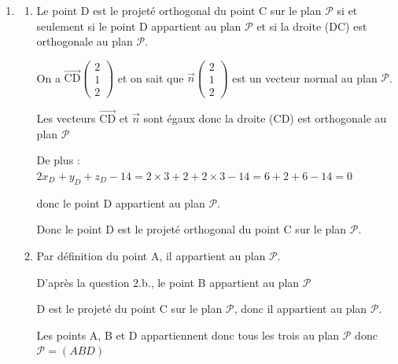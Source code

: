 \documentclass[10pt]{article}
\providecommand{\vect}[1]{\overrightarrow{#1}}
\providecommand{\vectt}[1]{\overrightarrow{\mathrm{#1}}}
\begin{document}
\begin{enumerate}
\begin{enumerate}
			Une équation cartésienne de $\mathcal{P}$ est donc bien :   $2x + y + 2z - 14 = 0$.
			\item  Un point appartient à un plan si et seulement si ses coordonnées vérifient une équation de ce plan.

			$2x_B+y_B+z_B-14 = 2 \times 5 -2 +2 \times 3 -14 =10-2+6-14 =0 $ 

			donc le point B appartient au plan $\mathcal{P}$.
			
			$2x_C+y_C+z_C-14 = 2 \times 1 +1 +2 \times 1 -14 = 2+1+2-14=-9 \neq 0 $ 
			
			donc le point C n'appartient pas au plan $\mathcal{P}$. 
			
		\end{enumerate}
		\item 
		\begin{enumerate}
			\item    Le point D est le projeté orthogonal du point C sur le plan $\mathcal{P}$ si et seulement si le point D appartient au plan $\mathcal{P}$ et si la droite (DC) est orthogonale au plan $\mathcal{P}$.

On a $\vectt{CD} \begin{pmatrix} 2\\1\\2  \end{pmatrix}$ et on sait que $\vect{n}\begin{pmatrix} 2 \\1\\2 \end{pmatrix}$ est un vecteur normal au plan $\mathcal{P}$.

Les vecteurs $\vectt{CD}$ et $\vect{n}$ sont égaux donc la droite (CD) est orthogonale au plan $\mathcal{P}$

De plus : $2x_D+y_D+z_D-14 = 2 \times 3 +2 +2 \times 3 -14 =6 +2+6-14 =0 $

donc le point D appartient au plan $\mathcal{P}$.

Donc le point D est le projeté orthogonal du point C sur le plan $\mathcal{P}$.
	\item  Par définition du point A, il appartient au plan $\mathcal{P}$. 

D'après la question 2.b., le point B appartient au plan $\mathcal{P}$

D est le projeté du point C sur le plan $\mathcal{P}$, donc il appartient au plan $\mathcal{P}$.

Les points A, B  et D  appartiennent donc tous les trois au plan $\mathcal{P}$  donc $\mathcal{P} = (ABD)$
	

\end{enumerate}
\end{enumerate}
\end{document}
